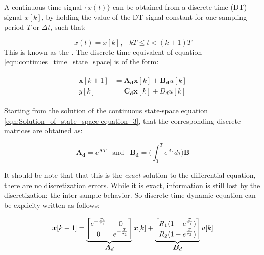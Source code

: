 \documentclass[12pt]{article}
\begin{document}
\noindent A continuous time signal $\{x(t)\}$ can be obtained from a discrete time (DT) signal ${x[k]}$, by holding the value of the DT signal constant for one sampling period $T$ or $\Delta t$, such that:

\begin{equation}
	\label{eqn:zero_order_hold}
	{x}(t) = x[k], \;\;\; kT \leq t < (k+1)T
\end{equation}
This is known as the . The discrete-time equivalent of equation \ref{eqn:continues_time_state_space} is of the form:

\begin{align}
	\begin{split}
	\bm{x}[k+1] &= \bm{A_{d}}\bm{x}[k] + \bm{B_{d}}u[k] \\
		y[k] &= \bm{C_{d}}\bm{x}[k] +  D_{d}u[k]
	\end{split}
\end{align}

\noindent Starting from the solution of the continuous state-space equation \ref{eqn:Solution_of_state_space equation_3}, that the corresponding discrete matrices are obtained as: 

\begin{equation}
	\label{eqn:discrete_system_matrices}
	\bm{A_d} = e^{\bm{A}T}\;\;\;\text{and}\;\;\;\bm{B_{d}}=\bigg(\int_{0}^{T}e^{A\tau}d\tau\bigg)\bm{B} 
\end{equation}

\noindent It should be note that that this is the \textit{exact} solution to the differential equation, there are no discretization errors. While it is exact, information is still lost by the discretization: the inter-sample behavior. So discrete time dynamic equation can be explicity written as follows:

\begin{equation}
	\label{eqn:discrete_state_space_matrix_form}
	\bm{x}[k+1] = \underbrace{\begin{bmatrix}
		e^{-\frac{Tt}{\tau_{1}}} & 0 \\
		0 & e^{-\frac{T}{\tau_{2}}} 
	\end{bmatrix}}_{\let\scriptstyle\textstyle\substack{\bm{A}_{d}}} \bm{x}[k] + \underbrace{\begin{bmatrix}
	R_{1}(1 - e^{\frac{T}{\tau_{1}}})  \\
	R_{2}(1 - e^{\frac{T}{\tau_{2}}})  
\end{bmatrix}}_{\let\scriptstyle\textstyle\substack{\bm{B}_{d}}} u[k]
\end{equation}
\end{document}

